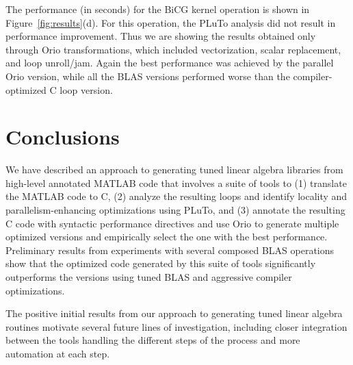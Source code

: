 \documentclass[runningheads]{llncs}
\begin{document}
The performance (in seconds) for the BiCG kernel operation is shown in
Figure~\ref{fig:results}(d). For this operation, the PLuTo analysis did not
result in performance improvement. Thus we are showing the results obtained
only through Orio transformations, which included vectorization, scalar
replacement, and loop unroll/jam. Again the best performance was achieved
by the parallel Orio version, while all the BLAS versions performed worse
than the compiler-optimized C loop version.

\section{Conclusions}
\label{sec:conclusion}

We have described an approach to generating tuned linear algebra libraries
from high-level annotated MATLAB code that involves a suite of tools to (1)
translate the MATLAB code to C, (2) analyze the resulting loops and identify
locality and parallelism-enhancing optimizations using PLuTo, and (3)
annotate the resulting C code with syntactic performance directives and use
Orio to generate multiple optimized versions and empirically select the one
with the best performance. Preliminary results from experiments with several
composed BLAS operations show that the optimized code generated by this suite
of tools significantly outperforms the versions using tuned BLAS and
aggressive compiler optimizations.

The positive initial results from our approach to generating tuned linear
algebra routines motivate several future lines of investigation, including closer
integration between the tools handling the different steps of the process and 
more automation at each step.

\end{document}

